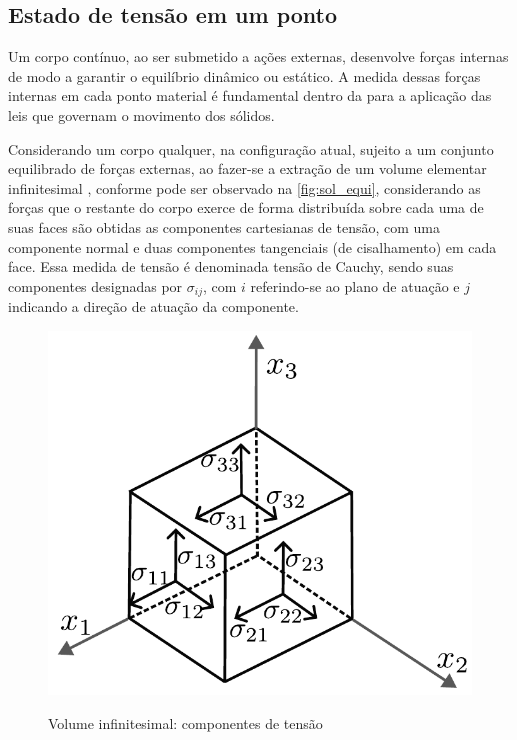 \subsection{Estado de tensão em um ponto}

Um corpo contínuo, ao ser submetido a ações externas, desenvolve forças internas de modo a garantir o equilíbrio dinâmico ou estático. A medida dessas forças internas em cada ponto material é fundamental dentro da para a aplicação das leis que governam o movimento dos sólidos.

Considerando um corpo qualquer, na configuração atual, sujeito a um conjunto equilibrado de forças externas, ao fazer-se a extração de um volume elementar infinitesimal , conforme pode ser observado na \autoref{fig:sol_equi}, considerando as forças que o restante do corpo exerce de forma distribuída sobre cada uma de suas faces são obtidas as componentes cartesianas de tensão, com uma componente normal e duas componentes tangenciais (de cisalhamento) em cada face. Essa medida de tensão é denominada tensão de Cauchy, sendo suas componentes designadas por $\sigma_{ij}$, com $i$ referindo-se ao plano de atuação e $j$ indicando a direção de atuação da componente.

\begin{figure}[!htbp]
	\caption{Volume infinitesimal: componentes de tensão}
	\centering
	\includegraphics[scale=0.5,trim=0cm 0.0cm 0cm 0cm, clip=true]{Imagens/Cap4/sol_vol_equi.pdf}	
	\label{fig:sol_equi}
\end{figure}

